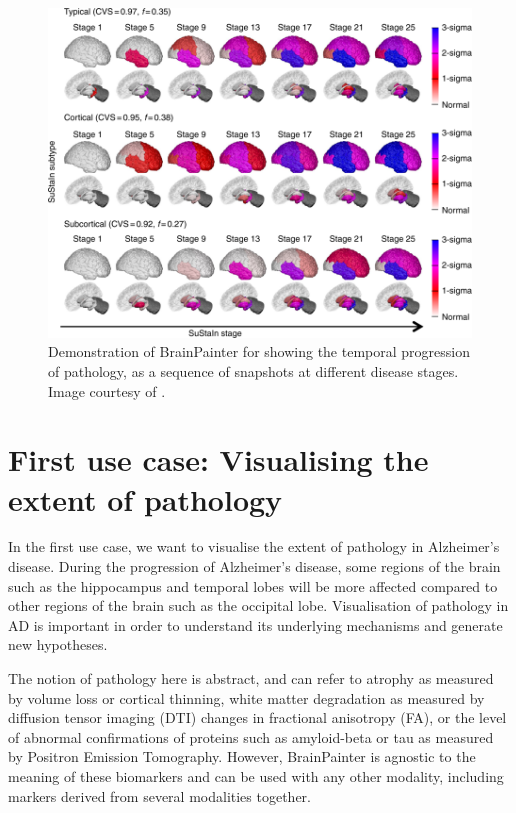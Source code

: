 \documentclass{llncs}
\begin{document}
\begin{figure}[htp]
\centering
 \includegraphics[width=1\textwidth, trim=20 0 0 220, clip]{images/young_progression.png}
 \caption{Demonstration of BrainPainter for showing the temporal progression of pathology, as a sequence of snapshots at different disease stages. Image courtesy of \cite{young2018uncovering}.}
  \label{fig:youngProg}
\end{figure}

\section{First use case: Visualising the extent of pathology}
\label{extent}

In the first use case, we want to visualise the extent of pathology in Alzheimer's disease. During the progression of Alzheimer's disease, some regions of the brain such as the hippocampus and temporal lobes will be more affected compared to other regions of the brain such as the occipital lobe. Visualisation of pathology in AD is important in order to understand its underlying mechanisms and generate new hypotheses. 

The notion of pathology here is abstract, and can refer to atrophy as measured by volume loss or cortical thinning, white matter degradation as measured by diffusion tensor imaging (DTI) changes in fractional anisotropy (FA), or the level of abnormal confirmations of proteins such as amyloid-beta or tau as measured by Positron Emission Tomography. However, BrainPainter is agnostic to the meaning of these biomarkers and can be used with any other modality, including markers derived from several modalities together. 
\end{document}
